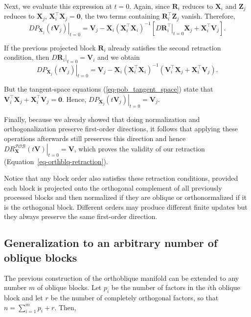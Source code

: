 \documentclass[
  12pt,
  letterpaper,
  article]{scrartcl}
\begin{document}
Next, we evaluate this expression at \(t=0\). Again, since
\(\mathbf{R}_i\) reduces to \(\mathbf{X}_i\) and \(\mathbf{Z}_j\)
reduces to \(\mathbf{X}_j\),
\(\mathbf{X}_i^\top\mathbf{X}_j=\mathbf{0}\), the two terms containing
\(\mathbf{R}_i^\top\mathbf{Z}_j\) vanish. Therefore, \[
\left. DP_{\mathbf{X}_j}(t\mathbf{V}_j) \right|_{t=0}
=
\mathbf{V}_j
-\mathbf{X}_i(\mathbf{X}_i^\top\mathbf{X}_i)^{-1}
\left[
\left.D\mathbf{R}_i^\top\right|_{t=0}\mathbf{X}_j
+\mathbf{X}_i^\top\mathbf{V}_j
\right].
\]

If the previous projected block \(\mathbf{R}_i\) already satisfies the
second retraction condition, then
\(\left.D\mathbf{R}_i\right|_{t=0}=\mathbf{V}_i\) and we obtain \[
\left. DP_{\mathbf{X}_j}(t\mathbf{V}_j) \right|_{t=0}
=
\mathbf{V}_j
-\mathbf{X}_i(\mathbf{X}_i^\top\mathbf{X}_i)^{-1}
\left(
\mathbf{V}_i^\top\mathbf{X}_j
+\mathbf{X}_i^\top\mathbf{V}_j
\right).
\]

But the tangent-space equations (\ref{eq-pob_tangent_space}) state that
\(\mathbf{V}_i^\top\mathbf{X}_j+\mathbf{X}_i^\top\mathbf{V}_j=\mathbf{0}\).
Hence,
\(\left. DP_{\mathbf{X}_j}(t\mathbf{V}_j) \right|_{t=0} = \mathbf{V}_j\).

Finally, because we already showed that doing normalization and
orthogonalization preserve first-order directions, it follows that
applying these operations afterwards still preserves this direction and
hence
\(\left. DR_{\mathbf{X}}^{\mathcal{POB}}(t\mathbf{V}) \right|_{t=0} = \mathbf{V}\),
which proves the validity of our retraction
(Equation~\ref{eq-orthblq-retraction}).

Notice that any block order also satisfies these retraction conditions,
provided each block is projected onto the orthogonal complement of all
previously processed blocks and then normalized if they are oblique or
orthonormalized if it is the orthogonal block. Different orders may
produce different finite updates but they always preserve the same
first-order direction.

\subsection{Generalization to an arbitrary number of oblique
blocks}\label{generalization-to-an-arbitrary-number-of-oblique-blocks}

The previous construction of the orthoblique manifold can be extended to
any number \(m\) of oblique blocks. Let \(p_i\) be the number of factors
in the \(i\)th oblique block and let \(r\) be the number of completely
orthogonal factors, so that \(n=\sum_{i=1}^m p_i+r\). Then,
\end{document}

